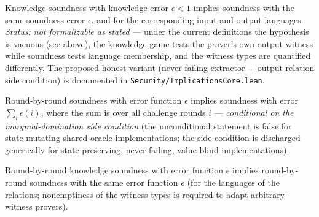 \begin{theorem}
    \label{thm:knowledge_soundness_implies_soundness}
    Knowledge soundness with knowledge error $\epsilon < 1$ implies soundness with the same
    soundness error $\epsilon$, and for the corresponding input and output languages.
    \emph{Status: not formalizable as stated} — under the current definitions the hypothesis is
    vacuous (see above), the knowledge game tests the prover's own output witness while soundness
    tests language membership, and the witness types are quantified differently.  The proposed
    honest variant (never-failing extractor + output-relation side condition) is documented in
    \texttt{Security/ImplicationsCore.lean}.
\end{theorem}

\begin{theorem}
    \label{thm:rbr_soundness_implies_soundness}
    Round-by-round soundness with error function $\epsilon$ implies soundness with error
    $\sum_i \epsilon(i)$, where the sum is over all challenge rounds $i$ --- \emph{conditional on
    the marginal-domination side condition} (the unconditional statement is false for
    state-mutating shared-oracle implementations; the side condition is discharged generically
    for state-preserving, never-failing, value-blind implementations).
\end{theorem}

\begin{theorem}
    \label{thm:rbr_knowledge_soundness_implies_rbr_soundness}
    Round-by-round knowledge soundness with error function $\epsilon$ implies round-by-round
    soundness with the same error function $\epsilon$ (for the languages of the relations;
    nonemptiness of the witness types is required to adapt arbitrary-witness provers).
\end{theorem}

